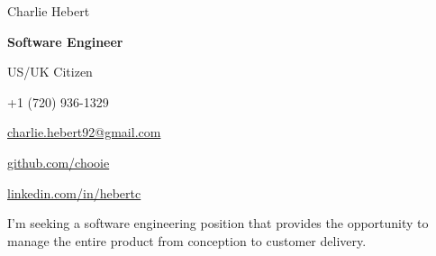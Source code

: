 \begin{center}
  {\Huge Charlie Hebert}

  \textbf{Software Engineer}

  US/UK Citizen
\end{center}

\noindent
\begin{minipage}[t]{0.5\textwidth}
  \begin{description}
    \raggedright
    \item[Mobile] +1 (720) 936-1329
    \item[Email]
      \href{mailto:charlie.hebert92@gmail.com}{charlie.hebert92@gmail.com}
  \end{description}
\end{minipage}
\noindent
\noindent
\begin{minipage}[t]{0.5\textwidth}
  \begin{description}
    \raggedleft
    \item[Github] \href{http://www.github.com/chooie}{github.com/chooie}
    \item[LinkedIn]
      \href{http://linkedin.com/in/hebertc}{linkedin.com/in/hebertc}
  \end{description}
\end{minipage}
\noindent

\begin{center}
  I'm seeking a software engineering position that provides the opportunity to
  manage the entire product from conception to customer delivery.
\end{center}

